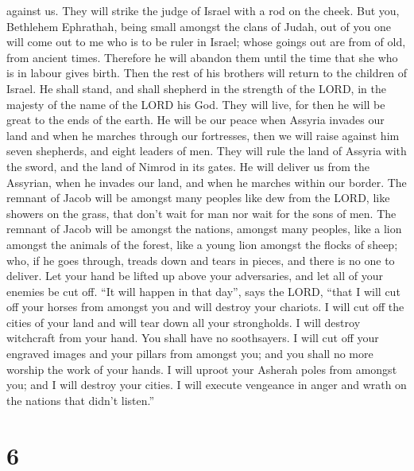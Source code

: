 against us. They will strike the judge of Israel with a rod on the
cheek.  But you, Bethlehem Ephrathah, being small amongst
the clans of Judah, out of you one will come out to me who is to be
ruler in Israel; whose goings out are from of old, from ancient times.
 Therefore he will abandon them until the time that she
who is in labour gives birth. Then the rest of his brothers will return
to the children of Israel.  He shall stand, and shall
shepherd in the strength of the LORD, in the majesty of the name of the
LORD his God. They will live, for then he will be great to the ends of
the earth.  He will be our peace when Assyria invades our
land and when he marches through our fortresses, then we will raise
against him seven shepherds, and eight leaders of men. 
They will rule the land of Assyria with the sword, and the land of
Nimrod in its gates. He will deliver us from the Assyrian, when he
invades our land, and when he marches within our border. 
The remnant of Jacob will be amongst many peoples like dew from the
LORD, like showers on the grass, that don't wait for man nor wait for
the sons of men.  The remnant of Jacob will be amongst the
nations, amongst many peoples, like a lion amongst the animals of the
forest, like a young lion amongst the flocks of sheep; who, if he goes
through, treads down and tears in pieces, and there is no one to
deliver.  Let your hand be lifted up above your
adversaries, and let all of your enemies be cut off. 
``It will happen in that day'', says the LORD, ``that I will cut off
your horses from amongst you and will destroy your chariots.
 I will cut off the cities of your land and will tear
down all your strongholds.  I will destroy witchcraft
from your hand. You shall have no soothsayers.  I will
cut off your engraved images and your pillars from amongst you; and you
shall no more worship the work of your hands.  I will
uproot your Asherah poles from amongst you; and I will destroy your
cities.  I will execute vengeance in anger and wrath on
the nations that didn't listen.''

\hypertarget{section-4}{%
\section{6}\label{section-4}}

